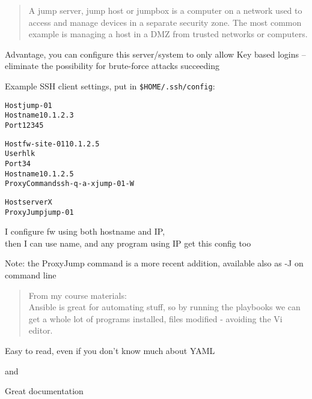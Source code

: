 \documentclass[Screen16to9,17pt]{foils}
\begin{document}
\begin{quote}
A jump server, jump host or jumpbox is a computer on a network used to access and manage devices in a separate security zone. The most common example is managing a host in a DMZ from trusted networks or computers.
\end{quote}


Advantage, you can configure this server/system to only allow Key based logins -- eliminate the possibility for brute-force attacks succeeding


Example SSH client settings, put in \verb+$HOME/.ssh/config+:
\begin{alltt}\footnotesize
Host jump-01
  Hostname 10.1.2.3
  Port 12345

Host fw-site-01 10.1.2.5
  User hlk
  Port 34
  Hostname 10.1.2.5
  ProxyCommand ssh -q -a -x jump-01 -W %h:%p

Host serverX
  ProxyJump jump-01
\end{alltt}

I configure fw using both hostname and IP,\\
then I can use name, and any program using IP get this config too

Note: the ProxyJump command is a more recent addition, available also as -J on command line



\begin{quote}
From my course materials:\\
Ansible is great for automating stuff, so by running the playbooks we can get a whole lot of programs installed, files modified - avoiding the Vi editor.
\end{quote}

\begin{list2}
\item Easy to read, even if you don't know much about YAML
\item {} and 
\item Great documentation\\
\end{list2}
\end{document}

